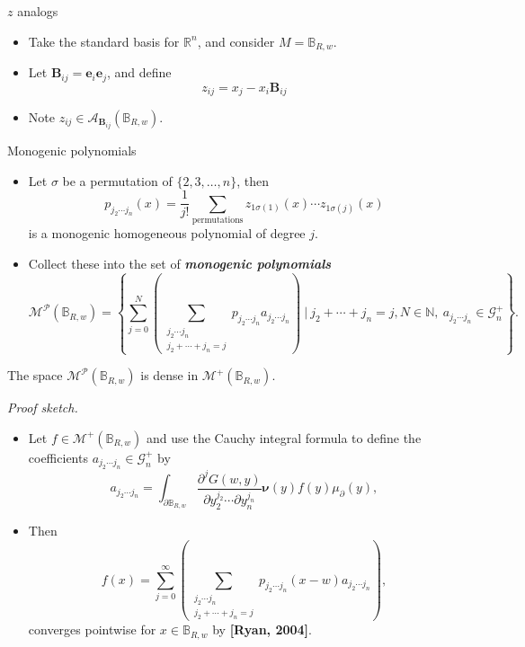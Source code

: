 \documentclass[aspectratio=169]{beamer}
\newcommand\boldgreen[1]{\textcolor{lighter_csu_green}{\emph{\textbf{#1}}}}
\newcommand\boldgold[1]{\textcolor{csu_gold}{\textbf{#1}}}
\newcommand{\R}{\mathbb{R}}
\newcommand{\algebra}{\mathcal{A}}
\newcommand{\G}{\mathcal{G}}
\newcommand{\monogenics}{\mathcal{M}}
\newcommand{\ball}{\mathbb{B}}
\newcommand{\blade}[1]{\boldsymbol{#1}}
\newcommand{\normal}{\blade{\nu}}
\newcommand{\bivector}{\blade{B}}
\begin{document}
\begin{frame}{$z$ analogs}
\vfill
\begin{itemize}
\pause
\item Take the standard basis for $\R^n$, and consider $M=\ball_{R,w}$.
\pause
\item Let $\bivector_{ij}=\blade{e}_i\blade{e}_j$, and define 
\[
z_{ij}=x_j-x_i \bivector_{ij}
\]
\pause
\item Note $z_{ij} \in \algebra_{\bivector_{ij}}(\ball_{R,w})$.
\end{itemize}
\vfill
\end{frame}

\begin{frame}{Monogenic polynomials}
\begin{itemize}
\pause

\item Let $\sigma$ be a permutation of $\{2,3,\dots,n\}$, then
\[
p_{j_2\cdots j_n}(x) = \frac{1}{j!} \sum_{\textrm{permutations}} z_{1\sigma(1)}(x)\cdots z_{1\sigma(j)}(x)
\]
is a monogenic homogeneous polynomial of degree $j$.
\pause
\item Collect these into the set of \boldgreen{monogenic polynomials}
\[
    \monogenics^\mathcal{P}(\ball_{R,w}) = \left\{\sum_{j=0}^N \left(\sum_{\substack{{j_2 \cdots j_n} \\ {j_2 + \cdots + j_n = j}}}p_{j_2 \cdots j_n}a_{j_2 \cdots j_n}\right) ~\vert~ j_2+\cdots+j_n = j, N\in \mathbb{N}, ~ a_{j_2\cdots j_n} \in \G_n^+\right\}.
\]
\end{itemize}
\end{frame}

\begin{frame}{}
\vfill
\begin{lemma}[Density]
The space $\monogenics^\mathcal{P}(\ball_{R,w})$ is dense in $\monogenics^+(\ball_{R,w})$.
\end{lemma}
\pause
\emph{Proof sketch.} 
\begin{itemize}
\pause
\item Let $f \in \monogenics^+(\ball_{R,w})$ and use the Cauchy integral formula to define the coefficients $a_{j_2\cdots j_n} \in \G_n^+$ by
\[
a_{j_2 \cdots j_n} = \int_{\partial \ball_{R,w}} \frac{\partial^j G(w,y)}{\partial y_2^{j_2} \cdots \partial y_n^{j_n}} \normal(y) f(y) \mu_\partial(y),
\]
\vspace*{-0.5cm}
\pause
\item Then
\[
f(x) = \sum_{j=0}^\infty \left(\sum_{\substack{{j_2 \cdots j_n} \\ {j_2 + \cdots + j_n = j}}} p_{j_2 \cdots j_n} (x-w) a_{j_2 \cdots j_n} \right),
\]
converges pointwise for $x\in \ball_{R,w}$ by \boldgold{[Ryan, 2004]}.
\end{itemize}
\vfill
\end{frame}
\end{document}
